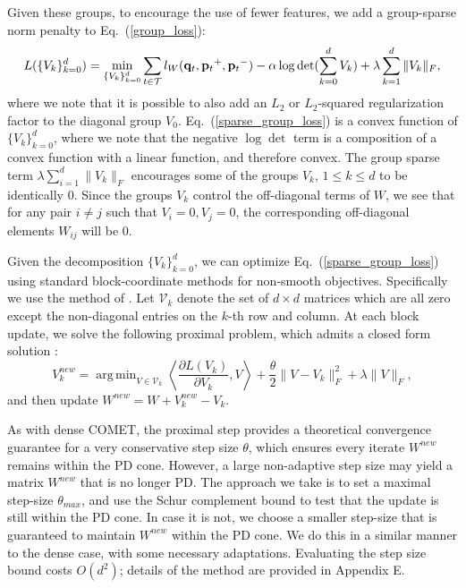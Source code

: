\documentclass[twoside,11pt]{article}
\newcommand\mat[1]{{#1}}
\renewcommand\vec[1]{\mathbf{#1}}
\newcommand{\W}{\mat{W}}
\newcommand{\q}{{\vec{q}}}
\newcommand{\p}{{\vec{p}}}
\newcommand{\trip}{{t}}
\newcommand{\qt}{{\q_{\trip}}}
\newcommand{\pt}{{\p_{\trip}}}
\newcommand{\Vk}{\mat{V_k}}
\newcommand{\Vg}{\{\Vk\}_{k=0}^{d}} %
\renewcommand{\eqref}[1]{Eq.~(\ref{#1})}
\DeclareMathOperator*{\argmin}{arg\,min}
\begin{document}
Given these groups, to encourage the use of fewer features, we add a group-sparse norm penalty to \eqref{group_loss}:
\begin{equation}
L(\Vg) = 
  \min_{\Vg} \sum_{\trip \in \cal{T}}   l_{\W}(\qt, \pt^+, \pt^-) - \alpha \log \det(\sum_{k=0}^{d}{\Vk}) + \lambda \sum_{k=1}^d \|V_k\|_F,
  \label{sparse_group_loss}
\end{equation} 
where we note that it is possible to also add an $L_2$ or $L_2$-squared regularization factor to the diagonal group $V_0$. \eqref{sparse_group_loss} is a convex function of $\Vg$, where we note that the negative $\log \det$ term is a composition of a convex function with a linear function, and therefore convex.
The group sparse term $\lambda \sum_{i=1}^d \|V_k\|_F$ encourages some of the groups $V_k$, $1\leq k \leq d$ to be identically $0$. Since the groups $V_k$ control the off-diagonal terms of $W$, we see that for any pair $i\neq j$ such that $V_i=0, V_j=0$, the corresponding off-diagonal elements $W_{ij}$ will be $0$. 

Given the decomposition $\Vg$, we can optimize \eqref{sparse_group_loss} using standard block-coordinate methods for non-smooth objectives. Specifically we use the method of \citet{richtarik2014iteration}. Let $\mathcal{V}_k$ denote the set of $d \times d$ matrices which are all zero except the non-diagonal entries on the $k$-th row and column. At each block update, we solve the following proximal problem, which admits a closed form solution \citep{bach2012optimization}:
\begin{equation}\label{eq:prox}
V_k^{new} = \argmin_{\mat{V} \in \mathcal{V}_k} \left\langle \frac{\partial{L (V_k)}}{\partial V_k}, \mat{V} \right\rangle + \frac{\theta}{2}\|V - V_k\|_F^2 + \lambda \|V\|_F,
\end{equation}
and then update $\W^{new} = \W + V_k^{new} - V_k$.

As with dense COMET, the proximal step provides a theoretical convergence guarantee for a very conservative step size $\theta$, which ensures every iterate $\W^{new}$ remains within the PD cone.
However, a large non-adaptive step size may yield a matrix $\W^{new}$ that is no longer PD. The approach we take is to set a maximal step-size $\theta_{max}$, and use the Schur complement bound to test that the update is still within the PD cone. In case it is not, we choose a smaller step-size that is guaranteed to maintain $W^{new}$ within the PD cone. We do this in a similar manner to the dense case, with some necessary adaptations. Evaluating the step size bound costs $O(d^2)$; details of the method are provided in Appendix E. 
\end{document}
